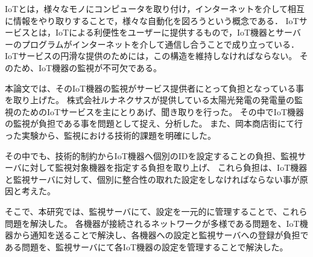 IoTとは，様々なモノにコンピュータを取り付け，インターネットを介して相互に情報をやり取りすることで，様々な自動化を図ろうという概念である．
IoTサービスとは，IoTによる利便性をユーザーに提供するもので，IoT機器とサーバーのプログラムがインターネットを介して通信し合うことで成り立っている．
IoTサービスの円滑な提供のためには，この構造を維持しなければならない。
そのため、IoT機器の監視が不可欠である。
\medskip

本論文では、そのIoT機器の監視がサービス提供者にとって負担となっている事を取り上げた。
株式会社ルナネクサスが提供している太陽光発電の発電量の監視のためのIoTサービスを主にとりあげ、聞き取りを行った。
その中でIoT機器の監視が負担である事を問題として捉え、分析した。
また、岡本商店街にて行った実験から、監視における技術的課題を明確にした。

その中でも、技術的制約からIoT機器へ個別のIDを設定することの負担、監視サーバに対して監視対象機器を指定する負担を取り上げ、
これら負担は、IoT機器と監視サーバに対して、個別に整合性の取れた設定をしなければならない事が原因と考えた。


\begin{comment}
IoT機器の監視には、次のような技術的課題があることが分かった。
\begin{itemize}
\item ネットワークの監視はIoTサービスが提供する機能とは別の機能である事
\item IoT機器の接続されるネットワークは想定できない事
\item IoT機器の接続されるネットワークがプライベートアドレスである場合が多い事
\item IoT機器は大量に利用される為、サーバへ設定することが負担となること
\end{itemize}
\medskip

そこで，本研究では，IoT機器から通知を送ることで，IoT機器が接続されるネットワークによらない機器の監視を実現し、IoTサービスとは別個の機器監視サービスとして開発することで、提供者の負担を軽減することを提案した。
既存手法では何が足りないのか議論し、IoTサービスの実践やサービス提供者への聞き取りを通して、サービスに必要な要件を抽出し、設計を行った。
\end{comment}

そこで、本研究では、監視サーバにて、設定を一元的に管理することで、これら問題を解決した。
各機器が接続されるネットワークが多様である問題を、IoT機器から通知を送ることで解決し、各機器への設定と監視サーバへの登録が負担である問題を、監視サーバにて各IoT機器の設定を管理することで解決した。

